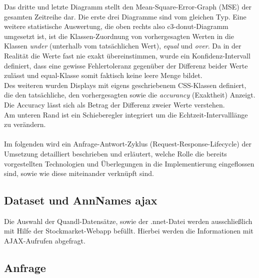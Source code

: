Das dritte und letzte Diagramm stellt den Mean-Square-Error-Graph (MSE) der gesamten Zeitreihe dar. Die erste drei Diagramme sind vom gleichen Typ. 
Eine weitere statistische Auswertung, die oben rechts also c3-donut-Diagramm umgesetzt ist, ist die Klassen-Zuordnung von vorhergesagten Werten in die Klassen \emph{under} (unterhalb vom tatsächlichen Wert), \emph{equal} und \emph{over}. Da in der Realität die Werte fast nie exakt übereinstimmen, wurde ein Konfidenz-Intervall definiert, dass eine gewisse Fehlertoleranz gegenüber der Differenz beider Werte zulässt und equal-Klasse somit faktisch keine leere Menge bildet. \\
Des weiteren wurden Displays mit eigens geschriebenem CSS-Klassen definiert, die den tatsächliche, den vorhergesagten sowie die \emph{accurancy} (Exaktheit) Anzeigt. Die Accuracy lässt sich als Betrag der Differenz zweier Werte verstehen. \\
Am unteren Rand ist ein Schieberegler integriert um die Echtzeit-Intervalllänge zu verändern.\\\\


Im folgenden wird ein Anfrage-Antwort-Zyklus (Request-Response-Lifecycle) der Umsetzung detailliert beschrieben und erläutert, welche Rolle die bereits vorgestellten Technologien und Überlegungen in die Implementierung eingeflossen sind, sowie wie diese miteinander verknüpft sind.      

\subsection{Dataset und AnnNames ajax}
\label{subsection:Dataset und AnnNames ajax}
Die Auswahl der Quandl-Datensätze, sowie der .nnet-Datei werden ausschließlich mit Hilfe der Stockmarket-Webapp befüllt. Hierbei werden die Informationen mit AJAX-Aufrufen abgefragt. 

\subsection{Anfrage}
\label{subsection:Anfrage}


